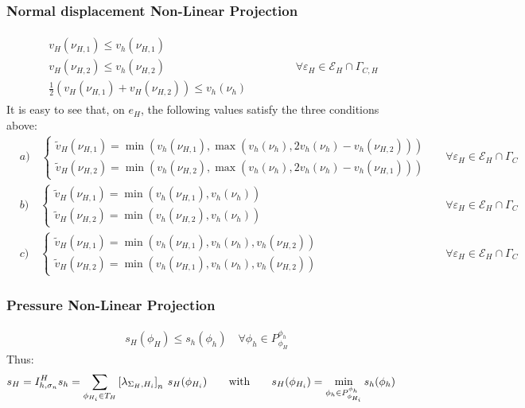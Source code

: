 \documentclass[8pt, oneside]{beamer}   	%
\begin{document}
\begin{frame}
\frametitle{Normal displacement Non-Linear Projection}
\footnotesize
\begin{align*}
\begin{aligned}
& v_H(\nu_{H,1}) \leq v_h(\nu_{H,1})\\
&  v_H(\nu_{H,2}) \leq v_h(\nu_{H,2})\\
&  \frac{1}{2}( v_H(\nu_{H,1}) + v_H(\nu_{H,2})) \leq v_h(\nu_{h})
\end{aligned}
\qquad \qquad \forall \varepsilon_H \in \mathcal{E}_H \cap \Gamma_{C,H}
\end{align*}
It is easy to see that, on $e_H$, the following values satisfy the three conditions above:
\begin{align*}
&
a)\quad\begin{cases}
\tilde{v}_H({\nu_{H,1}})= \min( v_h(\nu_{H,1}),\max( v_h(\nu_{h}), 2 v_h(\nu_{h}) - v_h(\nu_{H,2})) )\\
\tilde{v}_H({\nu_{H,2}})=\min( v_h(\nu_{H,2}),\max( v_h(\nu_{h}), 2 v_h(\nu_{h})- v_h(\nu_{H,1}) ) )
\end{cases}
&& \forall \varepsilon_H \in \mathcal{E}_H \cap \Gamma_C\\
&
b)\quad
\begin{cases}
\tilde{v}_H({\nu_{H,1}})= \min( v_h(\nu_{H,1}), v_h(\nu_{h}) )\\
\tilde{v}_H({\nu_{H,2}})=\min( v_h(\nu_{H,2}),v_h(\nu_{h} ) )
\end{cases}
&& \forall \varepsilon_H \in \mathcal{E}_H \cap \Gamma_C \\
&
c)\quad
\begin{cases}
\tilde{v}_H({\nu_{H,1}})= \min( v_h(\nu_{H,1}),v_h(\nu_{h}),  v_h(\nu_{H,2}) )\\
\tilde{v}_H({\nu_{H,2}})= \min( v_h(\nu_{H,1}),v_h(\nu_{h}),  v_h(\nu_{H,2}) )
\end{cases}
&& \forall \varepsilon_H \in \mathcal{E}_H \cap \Gamma_C
\end{align*}
\end{frame}




\begin{frame}
\frametitle{Pressure Non-Linear Projection}
\footnotesize
\begin{align*}
s_H(\phi_H) \leq s_h(\phi_h) \quad \forall \phi_h \in P_{\phi_H}^{\phi_h}
\end{align*}
Thus:
\begin{align*}
\displaystyle
&s_H=I_{h,\sigma_n}^H s_h= \sum_{\phi_{H_i} \in T_H} \left[ \lambda_{\Sigma_H,H_i}\right]_n \:s_H(\phi_{H_i})
\qquad \text{with} \qquad
 s_H(\phi_{H_i})= \min_{\phi_{h} \in P_{\phi_{H_i}}^{\phi_{h}}} s_h(\phi_h)
\end{align*}
\end{frame}
\end{document}
